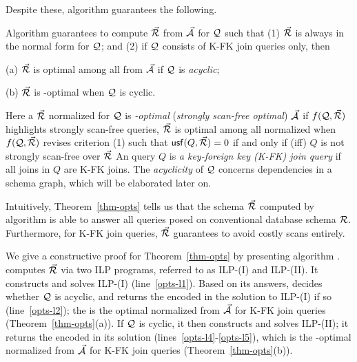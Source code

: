\vspace{1ex}
Despite these, algorithm \opts guarantees the following.

\vspace{-0.3ex}
\begin{theorem}\label{thm-opts}
Algorithm \opts guarantees to compute $\vec{{\mathcal R}}$ from $\vec{{\mathcal A}}$
for $\mathcal Q$ such that
(1) $\vec{{\mathcal R}}$ is always in the normal form for $\mathcal Q$; and
(2) if $\mathcal Q$ consists of K-FK join \SPC queries only, then
\bi
\item[(a)] $\vec{{\mathcal R}}$ is optimal among all \bdss from $\vec{{\mathcal A}}$
  if $\mathcal Q$ is {\em acyclic}; 
\item[(b)] $\vec{{\mathcal R}}$ is \ssf-optimal when $\mathcal Q$ is cyclic. 
\ei
\vspace{-3.5ex}
\end{theorem}

Here a \bds $\vec{{\mathcal R}}$ normalized for $\mathcal Q$ is {\em \ssf-optimal}
({\em strongly scan-free optimal}) \wrt $\vec{{\mathcal A}}$ if $f(\mathcal Q, \vec{{\mathcal R}})$
highlights strongly scan-free queries, \ie $\vec{{\mathcal R}}$ is optimal
among all normalized \bdss when $f(\mathcal Q, \vec{{\mathcal R}})$ revises
  criterion (1) such that ${\mathsf{usf}}(Q,\allowbreak \vec{{\mathcal R}}) \allowbreak = \allowbreak 0$ if
  and only if
  (iff) $Q$ is not strongly scan-free over $\vec{{\mathcal R}}$
An \SPC
query $Q$ is {\em a key-foreign key (K-FK) join query} if all joins in
$Q$ are K-FK joins.
The {\em acyclicity} of $\mathcal Q$ concerns dependencies
in a schema graph, which will be elaborated later on.

\vspace{0.6ex}
Intuitively, Theorem~\ref{thm-opts} tells us that the \baav schema
$\vec{{\mathcal R}}$ computed by
algorithm \opts is able to answer all \SQL queries posed
on conventional database schema ${\mathcal R}$. Furthermore, for 
K-FK join \SPC queries, $\vec{{\mathcal R}}$ guarantees to avoid
costly scans entirely.

\vspace{0.6ex}
We give a constructive proof for Theorem~\ref{thm-opts}
by presenting algorithm \opts. \opts
computes $\vec{{\mathcal R}}$ via two ILP programs,
referred to as ILP-(I) and ILP-(II).
It constructs and solves ILP-(I) (line~\ref{opts-l1}).
Based on its answers, \opts decides whether $\mathcal Q$ is acyclic,
and returns the \bds encoded in the solution to ILP-(I) if so
(line~\ref{opts-l2}); the \bds is the optimal normalized \bds from
$\vec{{\mathcal A}}$ for K-FK join \SPC queries
(Theorem~\ref{thm-opts}(a)). 
If $\mathcal Q$ is cyclic, it then constructs and
solves ILP-(II); it returns the \bds encoded in its solution
(lines~\ref{opts-l4}-\ref{opts-l5}), which
is the \ssf-optimal
normalized \bds from $\vec{{\mathcal A}}$ for K-FK join \SPC queries
(Theorem~\ref{thm-opts}(b)).

